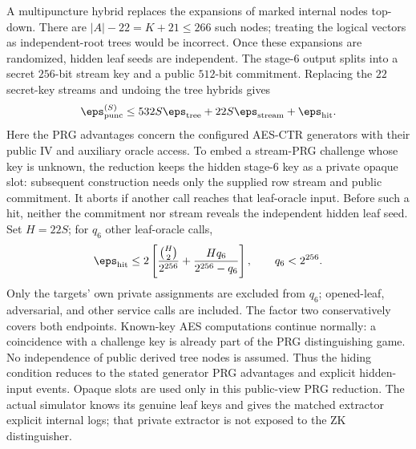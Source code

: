 A multipuncture hybrid replaces the expansions of marked internal nodes
top-down.  There are $|A|-22=K+21\le266$ such nodes; treating the logical
vectors as independent-root trees would be incorrect.  Once these expansions
are randomized, hidden leaf seeds are independent.  The stage-6 output splits
into a secret $256$-bit stream key and a public $512$-bit commitment.
Replacing the $22$ secret-key streams and undoing the tree hybrids gives
\[
\eps_{\rm punc}^{(S)}\le532S\eps_{\rm tree}
                       +22S\eps_{\rm stream}+\eps_{\rm hit}.
\]
Here the PRG advantages concern the configured AES-CTR generators with their
public IV and auxiliary oracle access.  To embed a stream-PRG challenge whose
key is unknown, the reduction keeps the hidden stage-6 key as a private
opaque slot: subsequent construction needs only the supplied row stream and
public commitment.  It aborts if another call reaches that leaf-oracle input.
Before such a hit, neither the commitment nor stream reveals the independent
hidden leaf seed.  Set $H=22S$; for $q_6$ other leaf-oracle calls,
\[
 \eps_{\rm hit}\le2\left[
       \frac{\binom H2}{2^{256}}
       +\frac{Hq_6}{2^{256}-q_6}\right],\qquad q_6<2^{256}.
\]
Only the targets' own private assignments are excluded
from $q_6$; opened-leaf, adversarial, and other service calls are included.
The factor two conservatively covers both endpoints.  Known-key AES
computations continue normally: a coincidence with a challenge key is already
part of the PRG distinguishing game.  No independence of public derived
tree nodes is assumed.  Thus the hiding condition reduces to the stated
generator PRG advantages and explicit hidden-input events.  Opaque slots
are used only in this public-view PRG reduction.  The actual simulator knows
its genuine leaf keys and gives the matched extractor explicit internal logs;
that private extractor is not exposed to the ZK distinguisher.

